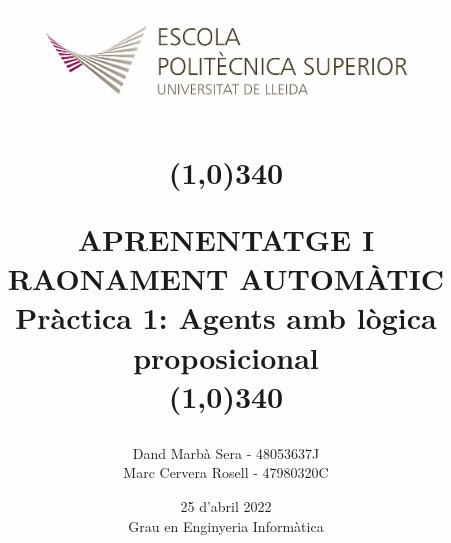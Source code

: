 \title{
	\begin{center}
	\vspace{3cm}
	\includegraphics[width=11cm, height=3cm]{images/Logo-nou-eps.jpg}
	\end{center}
	\begin{center}
	\line(1,0){340}
	\end{center}		
	APRENENTATGE I RAONAMENT AUTOMÀTIC\\
	\vspace{2mm}
	\Large Pràctica 1: Agents amb lògica proposicional\\
	\line(1,0){340}
	\vspace{2.5cm}
	}

\author{Dand Marbà Sera - 48053637J \\   Marc Cervera Rosell - 47980320C \vspace{1cm}}


\date{25 d'abril  2022\vspace{0.5cm} \\Grau en Enginyeria Informàtica}